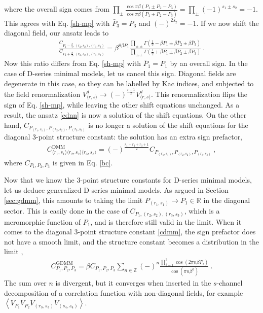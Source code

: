 \documentclass[12pt, a4paper]{article}
\begin{document}
where the overall sign comes from $\prod_\pm \frac{\cos \pi\beta(P_1\pm P_2-P_3)}{\cos\pi\beta(\bar P_1\pm \bar P_2-P_3)} = \prod_\pm (-1)^{s_1\pm s_2} = -1$. This agrees with Eq. \eqref{sh-mp} with $\bar P_3=P_3$ and $(-)^{2s_2}=-1$. If we now shift the diagonal field, our ansatz leads to 
\begin{align}
 \frac{C_{P_1-\frac{\beta}{2},(r_2,s_2),(r_3,s_3)}}{C_{P_1+\frac{\beta}{2},(r_2,s_2),(r_3,s_3)}} =\beta^{8\beta P_1}\frac{\prod_{\pm,\pm} \Gamma(\frac12-\beta P_1\pm \beta\bar P_2\pm \beta \bar P_3)}{\prod_{\pm,\pm} \Gamma(\frac12+\beta P_1\pm \beta P_2\pm \beta P_3)}\ .
\end{align}
Now this ratio differs from Eq. \eqref{sh-mp} with $\bar P_1=P_1$ by an overall sign. 
In the case of D-series minimal models, 
let us cancel this sign.
Diagonal fields are degenerate in this case, so they can be labelled by Kac indices, and subjected to the field renormalization
$V^d_{\langle r,s\rangle}\to (-)^{\frac{r+1}{2}} V^d_{\langle r,s\rangle}$. 
This renormalization flips the sign of Eq. \eqref{sh-mp}, while leaving the other shift equations unchanged. As a result, the ansatz \eqref{cdnn} is now a solution of the shift equations. On the other hand, $C_{P_{(r_1,s_1)},P_{(r_2,s_2)},P_{(r_3,s_3)}}$ is no longer a solution
of the shift equations for the diagonal 3-point structure constant: the solution has an extra sign prefactor,
\begin{align}
 \boxed{C^\text{DMM}_{\langle r_1,s_1\rangle\langle r_2,s_2\rangle\langle r_3,s_3\rangle} = (-)^\frac{r_1+r_2+r_3+1}{2} C_{P_{(r_1,s_1)},P_{(r_2,s_2)},P_{(r_3,s_3)}}}\ , 
 \label{cdmm}
\end{align}
where $C_{P_1,P_2,P_3}$ is given in Eq. \eqref{bc}.

Now that we know the 3-point structure constants for D-series minimal models, let us deduce generalized D-series minimal models. As argued in Section \ref{sec:gdmm}, this amounts to taking the limit $P_{(r_1,s_1)}\to P_1\in\mathbb{R}$ in the diagonal sector. This is easily done in the case of $C_{P_1,(r_2,s_2),(r_3,s_3)}$, which is a meromorphic function of $P_1$, and is therefore still valid in the limit. When it comes to the diagonal 3-point structure constant \eqref{cdmm}, the sign prefactor does not have a smooth limit, and the structure constant becomes a distribution in the limit \cite{rib19},
\begin{align}
 \boxed{C^\text{GDMM}_{P_1,P_2,P_3} = \beta C_{P_1,P_2,P_3}\sum_{n\in\mathbb{Z}}(-)^n \frac{\prod_{i=1}^3 \cos(2\pi n\beta P_i)}{\cos(\pi n\beta^2)}}\ .
 \label{cgdmm}
\end{align}
The sum over $n$ is divergent, but it converges when inserted in the $s$-channel decomposition of a correlation function with non-diagonal fields, for example $\left<V_{P_1}V_{P_2}V_{(r_3,s_3)}V_{(s_4,s_4)}\right>$. 
\end{document}
